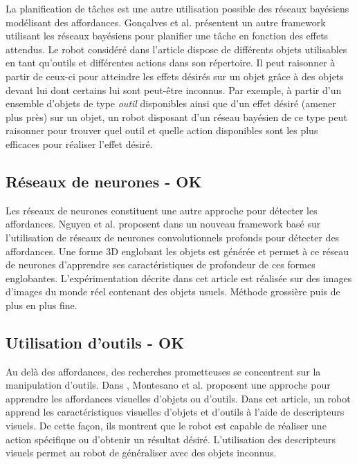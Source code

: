 \documentclass[draft]{llncs}
\begin{document}
La planification de tâches est une autre utilisation possible des réseaux bayésiens modélisant des affordances.
Gonçalves et al. présentent un autre framework utilisant les réseaux bayésiens \cite{Goncalves2014} pour planifier une tâche en fonction des effets attendus.
Le robot considéré dans l'article dispose de différents objets utilisables en tant qu'outils et différentes actions dans son répertoire.
Il peut raisonner à partir de ceux-ci pour atteindre les effets désirés sur un objet grâce à des objets devant lui dont certains lui sont peut-être inconnus.
Par exemple, à partir d'un ensemble d'objets de type \textit{outil} disponibles ainsi que d'un effet désiré (amener plus près) sur un objet, un robot disposant d'un réseau bayésien de ce type peut raisonner pour trouver quel outil et quelle action disponibles sont les plus efficaces pour réaliser l'effet désiré.




\subsection{Réseaux de neurones - OK}

Les réseaux de neurones constituent une autre approche pour détecter les affordances.
Nguyen et al. proposent dans \cite{Nguyen2017} un nouveau framework basé sur l'utilisation de réseaux de neurones convolutionnels profonds pour détecter des affordances.
Une forme 3D englobant les objets est générée et permet à ce réseau de neurones d'apprendre ses caractéristiques de profondeur de ces formes englobantes.
L'expérimentation décrite dans cet article est réalisée sur des images d'images du monde réel contenant des objets usuels.
Méthode grossière puis de plus en plus fine.



\subsection{Utilisation d'outils - OK}

Au delà des affordances, des recherches prometteuses se concentrent sur la manipulation d'outils.
Dans \cite{Montesano2008}, Montesano et al. proposent une approche pour apprendre les affordances visuelles d'objets ou d'outils.
Dans cet article, un robot apprend les caractéristiques visuelles d'objets et d'outils à l'aide de descripteurs visuels.
De cette façon, ils montrent que le robot est capable de réaliser une action spécifique ou d'obtenir un résultat désiré.
L'utilisation des descripteurs visuels permet au robot de généraliser avec des objets inconnus.
\end{document}
